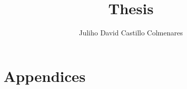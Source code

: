 \documentclass[a4paper,10pt]{book}
\author{Juliho David Castillo Colmenares}
\title{Thesis}
\begin{document}
\maketitle
\tableofcontents





\chapter{Appendices}




\end{document}
